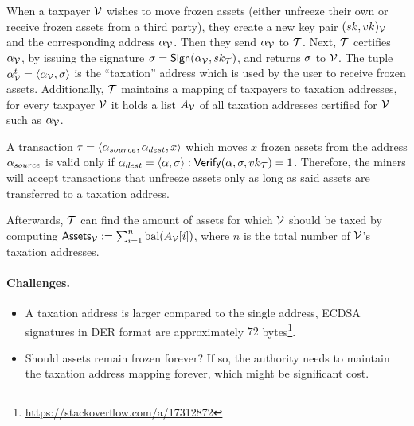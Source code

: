 When a taxpayer $\mathcal{V}$ wishes to move frozen assets (either unfreeze their own
or receive frozen assets from a third party), they create a new key pair
$(sk, vk)_\mathcal{V}$ and the corresponding address $\alpha_\mathcal{V}$. Then they send
$\alpha_\mathcal{V}$ to $\mathcal{T}$. Next, $\mathcal{T}$ certifies $\alpha_\mathcal{V}$, by
issuing the signature $\sigma = \mathsf{Sign}(\alpha_\mathcal{V}, sk_\mathcal{T})$,
and returns $\sigma$ to $\mathcal{V}$. The tuple $\alpha_\mathcal{V}^{t} = \langle
\alpha_\mathcal{V}, \sigma \rangle$ is the ``taxation'' address which is used by the
user to receive frozen assets. Additionally, $\mathcal{T}$ maintains a mapping of
taxpayers to taxation addresses, \ie for every taxpayer $\mathcal{V}$ it holds a list
$A_\mathcal{V}$ of all taxation addresses certified for $\mathcal{V}$ such as
$\alpha_\mathcal{V}$.

A transaction $\tau = \langle \alpha_{source}, \alpha_{dest}, x \rangle$
which moves $x$ frozen assets from the address $\alpha_{source}$ is valid
only if $\alpha_{dest} = \langle \alpha, \sigma \rangle:
\mathsf{Verify}(\alpha, \sigma, vk_\mathcal{T}) = 1$. Therefore, the miners
will accept transactions that unfreeze assets only as long as said assets are
transferred to a taxation address.

Afterwards, $\mathcal{T}$ can find the amount of assets for which $\mathcal{V}$ should
be taxed by computing $\mathsf{Assets}_\mathcal{V} := \sum_{i=1}^{n} \text{bal}(A_{\mathcal{V}}[i])$,
where $n$ is the total number of $\mathcal{V}$'s taxation addresses.

\paragraph{Challenges.}

\begin{itemize}
    \item A taxation address is larger compared to the single address, \eg
        ECDSA signatures in DER format are approximately $72$
        bytes\footnote{\url{https://stackoverflow.com/a/17312872}}.
    \item Should assets remain frozen forever? If so, the authority needs to
        maintain the taxation address mapping forever, which might be
        significant cost.
\end{itemize}
